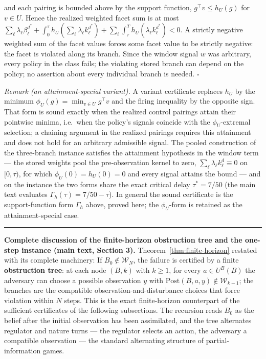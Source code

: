 \documentclass[11pt]{article}
\theoremstyle{definition}
\begin{document}
and each pairing is bounded above by the support function,
\(g^{\top} v \le h_{U}(g)\) for \(v \in U\). Hence the realized weighted
facet sum is at most
\(\sum_{\ell} \lambda_{\ell} \beta_{\ell}^{d^{*}} + \int_{0}^{\tau}
h_{U}(\sum_{\ell} \lambda_{\ell} k_{\ell}^{d^{*}}) + \sum_{\ell}
\int_{\tau}^{T} h_{U}(\lambda_{\ell} k_{\ell}^{d^{*}}) < 0\). A strictly
negative weighted sum of the facet values forces some facet value to be
strictly negative: the facet is violated along its branch. Since the
window signal \(w\) was arbitrary, every policy in the class fails;
the violating stored branch can depend on the policy; no assertion
about every individual branch is needed. \(\square\)

\emph{Remark (an attainment-special variant).} A variant certificate
replaces \(h_{U}\) by the minimum \(\phi_{U}(g) = \min_{v \in U}
g^{\top} v\) and the firing inequality by the opposite sign. That form
is sound exactly when the realized control pairings attain their
pointwise minima, i.e.\ when the policy's signals coincide with the
\(\phi_{U}\)-extremal selection; a chaining argument in the realized
pairings requires this attainment and does not hold for an arbitrary
admissible signal. The pooled construction of the three-branch instance satisfies
the attainment hypothesis in the window term --- the stored weights
pool the pre-observation kernel to zero, \(\sum_{\ell}
\lambda_{\ell} k_{\ell}^{d} \equiv 0\) on \([0, \tau)\), for which
\(\phi_{U}(0) = h_{U}(0) = 0\) and every signal attains the bound --- and on the instance the two forms share the exact critical delay
\(\tau^{*} = 7/50\) (the main text evaluates \(\Gamma_{h}(\tau) = 7/50 - \tau\)). In general the sound
certificate is the support-function form \(\Gamma_{h}\) above, proved
here; the \(\phi_{U}\)-form is retained as the attainment-special case.
\rule{0.5\linewidth}{0.5pt}

\bigskip
\noindent\textbf{Complete discussion of the finite-horizon obstruction tree and the one-step instance (main text, Section 3).}
Theorem~\ref{thm:finite-horizon} restated with its complete machinery:
If \(B_0\notin\mathcal W_N\), the failure is certified by a finite
\textbf{obstruction tree}: at each node \((B,k)\) with \(k\ge1\), for
every \(a\in U^B(B)\) the adversary can choose a possible observation
\(y\) with \(\mathrm{Post}(B,a,y)\notin\mathcal W_{k-1}\); the branches
are the compatible observation-and-disturbance choices that force
violation within \(N\) steps. This is the exact finite-horizon
counterpart of the sufficient certificates of the following subsections. The recursion reads \(B_0\) as the belief after the
initial observation has been assimilated, and the tree alternates
regulator and nature turns --- the regulator selects an action, the
adversary a compatible observation --- the standard alternating
structure of partial-information games.
\end{document}
